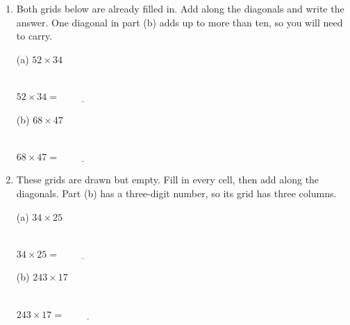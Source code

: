 \documentclass[12pt,a4paper]{article}
\newcommand{\ansline}[1][2.2cm]{\underline{\hspace{#1}}}
\newcommand{\lsetup}[2]{%
  \edef\lC{\the\numexpr#1\relax}\edef\lR{\the\numexpr#2\relax}%
  \edef\lCm{\the\numexpr#1-1\relax}\edef\lRm{\the\numexpr#2-1\relax}}
\newcommand{\lgrid}{%
  \draw[thick] (0,0) rectangle (\lC,\lR);
  \foreach \i in {1,...,\lCm}{\draw (\i,0) -- (\i,\lR);}
  \foreach \j in {1,...,\lRm}{\draw (0,\j) -- (\lC,\j);}
  \foreach \i in {1,...,\lC}{\foreach \j in {1,...,\lR}{%
    \draw[gray!75] ({\i-1},{\j-1}) -- (\i,\j);}}}
\newcommand{\ltop}[2]{\node[font=\small] at ({#1-0.5},{\lR+0.34}) {#2};}
\newcommand{\lside}[2]{\node[font=\small] at ({\lC+0.34},{\lR-#1+0.5}) {#2};}
\newcommand{\lcell}[4]{%
  \node[font=\small] at ({#1-0.72},{\lR-#2+0.70}) {#3};
  \node[font=\small] at ({#1-0.28},{\lR-#2+0.30}) {#4};}
\newcommand{\lanslines}{%
  \foreach \j in {1,...,\lR}{\draw[gray!60] (-0.74,{\lR-\j+0.28}) -- (-0.14,{\lR-\j+0.28});}
  \foreach \i in {1,...,\lC}{\draw[gray!60] ({\i-0.8},-0.6) -- ({\i-0.2},-0.6);}}
\begin{document}
\begin{enumerate}

\item Both grids below are already filled in. Add along the diagonals and
write the answer. One diagonal in part (b) adds up to more than ten, so you
will need to carry.
\vspace{2pt}

\begin{minipage}[t]{0.5\linewidth}
\centering
(a) $52\times34$\\[4pt]
\\[8pt]
$52\times34=\ansline[2cm]$
\end{minipage}%
\begin{minipage}[t]{0.5\linewidth}
\centering
(b) $68\times47$\\[4pt]
\\[8pt]
$68\times47=\ansline[2cm]$
\end{minipage}

\newpage

\item These grids are drawn but empty. Fill in every cell, then add along the
diagonals. Part (b) has a three-digit number, so its grid has three columns.
\vspace{2pt}

\begin{minipage}[t]{0.42\linewidth}
\centering
(a) $34\times25$\\[4pt]
\\[8pt]
$34\times25=\ansline[2cm]$
\end{minipage}%
\begin{minipage}[t]{0.58\linewidth}
\centering
(b) $243\times17$\\[4pt]
\\[8pt]
$243\times17=\ansline[2cm]$
\end{minipage}

\end{enumerate}
\end{document}
